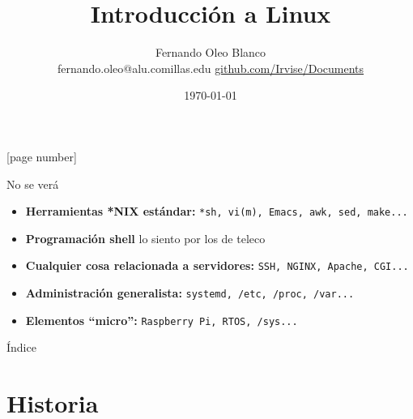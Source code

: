 \documentclass[12pt]{beamer}
\begin{document}
	\author{Fernando Oleo Blanco \\ fernando.oleo@alu.comillas.edu \hfill 	\href{https://github.com/Irvise/Documents}{github.com/Irvise/Documents}}
	\title{Introducción a Linux}
	\date{\today}
	[page number]
\begin{frame}[plain]
	\maketitle
\end{frame}

\begin{frame}{No se verá}
	\begin{itemize}
		\item \textbf{Herramientas *NIX estándar:} \texttt{*sh, vi(m), Emacs, awk, sed, make...}
		\item \textbf{Programación shell} \tiny lo siento por los de teleco \normalsize
		\item \textbf{Cualquier cosa relacionada a servidores:} \texttt{SSH, NGINX, Apache, CGI...}
		\item \textbf{Administración generalista:} \texttt{systemd, /etc, /proc, /var...}
		\item \textbf{Elementos ``micro'':} \texttt{Raspberry Pi, RTOS, /sys...}
	\end{itemize}
\end{frame}

\begin{frame}[allowframebreaks]{Índice}
	\tableofcontents
\end{frame}

\section{Historia}
\end{document}
